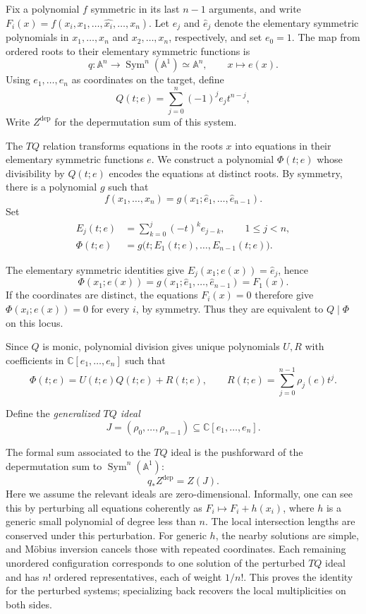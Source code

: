 \documentclass[11pt]{article}
\theoremstyle{definition}
\newcommand{\A}{\mathbb A}
\newcommand{\C}{\mathbb C}
\newcommand{\Sym}{\operatorname{Sym}}
\begin{document}
Fix a polynomial $f$ symmetric in its last $n-1$ arguments, and write
$F_i(x)=f(x_i,x_1,\ldots,\widehat{x_i},\ldots,x_n)$.
Let $e_j$ and $\hat e_j$ denote the elementary symmetric polynomials
in $x_1,\ldots,x_n$ and $x_2,\ldots,x_n$, respectively, and set $e_0=1$.
The map from ordered roots to their elementary symmetric functions is
\[
 q:\A^n\longrightarrow\Sym^n(\A^1)\simeq\A^n,
 \qquad x\longmapsto e(x).
\]
Using $e_1,\ldots,e_n$ as coordinates on the target, define
\[
 Q(t;e)=\sum_{j=0}^n(-1)^je_jt^{n-j},
\]
Write $Z^{\mathrm{dep}}$ for the depermutation sum of this system.

The $TQ$ relation transforms equations in the roots $x$ into equations
in their elementary symmetric functions $e$. We construct a polynomial
$\Phi(t;e)$ whose divisibility by $Q(t;e)$
encodes the equations at distinct roots. By symmetry, there is a
polynomial $g$ such that
\[
 f(x_1,\ldots,x_n)=g(x_1;\hat e_1,\ldots,\hat e_{n-1}).
\]
Set
\begin{align*}
	E_j(t;e)&=\sum_{k=0}^j(-t)^ke_{j-k},\qquad 1\le j<n,\\
	\Phi(t;e)&=g\bigl(t;E_1(t;e),\ldots,E_{n-1}(t;e)\bigr).
\end{align*}

The elementary symmetric identities give
$E_j(x_1;e(x))=\hat e_j$, hence
\[
 \Phi(x_1;e(x))=g(x_1;\hat e_1,\ldots,\hat e_{n-1})=F_1(x).
\]
If the coordinates are distinct, the equations $F_i(x)=0$ therefore
give $\Phi(x_i;e(x))=0$ for every $i$, by symmetry. Thus they are
equivalent to $Q\mid\Phi$ on this locus.

Since $Q$ is monic, polynomial division gives unique polynomials $U,R$
with coefficients in $\C[e_1,\ldots,e_n]$ such that
\begin{equation}\label{eq:general-tq-division}
	\Phi(t;e)=U(t;e)Q(t;e)+R(t;e),\qquad
	R(t;e)=\sum_{j=0}^{n-1}\rho_j(e)t^j.
\end{equation}

Define the \emph{generalized $TQ$ ideal}
\begin{equation}\label{eq:general-tq-ideal}
 J=(\rho_0,\ldots,\rho_{n-1})\subseteq\C[e_1,\ldots,e_n].
\end{equation}

The formal sum associated to the $TQ$ ideal is the pushforward of the
depermutation sum to $\Sym^n(\A^1)$:
\[
 q_*Z^{\mathrm{dep}}=Z(J).
\]
Here we assume the relevant ideals are zero-dimensional. Informally,
one can see this by perturbing all equations coherently as
$F_i\mapsto F_i+h(x_i)$, where $h$ is a generic small polynomial of
degree less than $n$. The local intersection lengths are conserved
under this perturbation. For generic $h$, the nearby solutions are
simple, and M\"obius inversion cancels those with repeated coordinates.
Each remaining unordered configuration corresponds to one solution of
the perturbed $TQ$ ideal and has $n!$ ordered representatives, each of
weight $1/n!$. This proves the identity for the perturbed systems;
specializing back recovers the local multiplicities on both sides.
\end{document}

